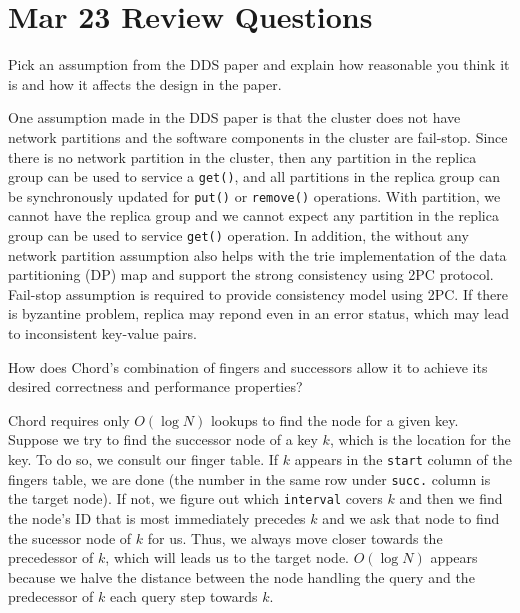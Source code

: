 \section{Mar 23 Review Questions}
\begin{QandA}
   \item Pick an assumption from the DDS paper and explain how reasonable you think it is and how it affects the design in the paper.
         \begin{answered}
         One assumption made in the DDS paper is that the cluster does not have network partitions and the software components in the
         cluster are fail-stop. Since there is no network partition in the cluster, then any partition in the replica group can be
         used to service a \texttt{get()}, and all partitions in the replica group can be synchronously updated for \texttt{put()} or 
         \texttt{remove()} operations. With partition, we cannot have the replica group and we cannot expect any partition in the replica
         group can be used to service \texttt{get()} operation. In addition, the without any network partition assumption also helps with
         the trie implementation of the data partitioning (DP) map and support the strong consistency using 2PC protocol. Fail-stop assumption
         is required to provide consistency model using 2PC. If there is byzantine problem, replica may repond even in an error status, which may
         lead to inconsistent key-value pairs.
         \end{answered}

   \item  How does Chord's combination of fingers and successors allow it to achieve its desired correctness and performance properties?
         \begin{answered}
		 Chord requires only $O(\log N)$ lookups to find the node for a given key. Suppose we try to find the successor node of a key $k$, which
		 is the location for the key. To do so, we consult our finger table. If $k$ appears in the \texttt{start} column of the fingers table, we 
		 are done (the number in the same row under \texttt{succ.} column is the target node). If not, we figure out which \texttt{interval} covers $k$ and then we find the node's ID that is most immediately precedes $k$
		 and we ask that node to find the sucessor node of $k$ for us. Thus, we always move closer towards the precedessor of $k$, which will leads
		 us to the target node. $O(\log N)$ appears because we halve the distance between the node handling the query and the predecessor of $k$ 
		 each query step towards $k$.
         \end{answered}
\end{QandA}





